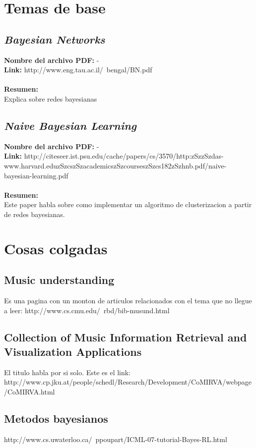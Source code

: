 \documentclass[a4paper,10pt]{article}
\newcommand{\titulo}[1]{\def\Titulo{#1}}
\newcommand{\resumen}[1]{\def\Resumen{#1}}
\newcommand{\link}[1]{\def\Link{#1}}
\newenvironment{resumenpaper}{
\let\Titulo\empty
\let\Resumen\empty
\let\Archivo-
\let\Link-
\let\Id\empty
}{
\subsection{\textit{\Titulo}}
\label{\Id}
\noindent \textbf{Nombre del archivo PDF: }{\Archivo}\\
\noindent \textbf{Link: }{\Link}\\ \\
\noindent \textbf{Resumen:} \\ {\Resumen}
}
\begin{document}
\section{Temas de base}
\begin{resumenpaper}
 \titulo{Bayesian Networks}
 \link{http://www.eng.tau.ac.il/~bengal/BN.pdf}
 \resumen{Explica sobre redes bayesianas}
\end{resumenpaper}

\begin{resumenpaper}
 \titulo{Naive Bayesian Learning}
 \link{http://citeseer.ist.psu.edu/cache/papers/cs/3570/http:zSzzSzdas-www.harvard.eduzSzcszSzacademicszSzcourseszSzcs182zSzhnb.pdf/naive-bayesian-learning.pdf}
 \resumen{Este paper habla sobre como implementar un algoritmo de clusterizacion a partir de redes bayesianas.}
\end{resumenpaper}

\section{Cosas colgadas}
\subsection{Music understanding}
Es una pagina con un monton de articulos relacionados con el tema que no llegue a leer: http://www.cs.cmu.edu/~rbd/bib-musund.html

\subsection{Collection of Music Information Retrieval and Visualization Applications}
El titulo habla por si solo. Este es el link: http://www.cp.jku.at/people/schedl/Research/Development/CoMIRVA/webpage/CoMIRVA.html

\subsection{Metodos bayesianos}
http://www.cs.uwaterloo.ca/~ppoupart/ICML-07-tutorial-Bayes-RL.html
\end{document}
